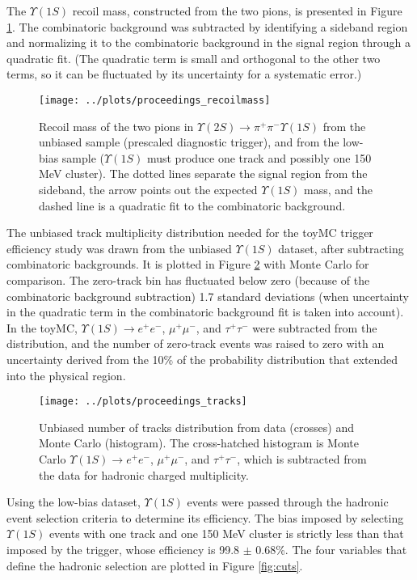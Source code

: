 \documentclass[aps,prd,preprint,superscriptaddress,tightenlines,nofootinbib,floatfix]{revtex4}
\begin{document}
The $\Upsilon(1S)$ recoil mass, constructed from the two pions, is
presented in Figure \ref{fig:recoilmass}.  The combinatoric background
was subtracted by identifying a sideband region and normalizing it to
the combinatoric background in the signal region through a quadratic
fit.  (The quadratic term is small and orthogonal to the other two
terms, so it can be fluctuated by its uncertainty for a systematic
error.)

\begin{figure}[p]
  \texttt{[image: ../plots/proceedings\_recoilmass]}
  \caption{\label{fig:recoilmass} Recoil mass of the two pions in
    $\Upsilon(2S) \to \pi^+\pi^- \Upsilon(1S)$ from the unbiased
    sample (prescaled diagnostic trigger), and from the low-bias
    sample ($\Upsilon(1S)$ must produce one track and possibly one 150
    MeV cluster).  The dotted lines separate the signal region from
    the sideband, the arrow points out the expected $\Upsilon(1S)$
    mass, and the dashed line is a quadratic fit to the combinatoric
    background.}
\end{figure}

The unbiased track multiplicity distribution needed for the toyMC
trigger efficiency study was drawn from the unbiased $\Upsilon(1S)$
dataset, after subtracting combinatoric backgrounds.  It is plotted in
Figure \ref{fig:unbiasedtracks} with Monte Carlo for comparison.  The
zero-track bin has fluctuated below zero (because of the combinatoric
background subtraction) 1.7 standard deviations (when uncertainty in
the quadratic term in the combinatoric background fit is taken into
account).  In the toyMC, $\Upsilon(1S) \to e^+e^-$, $\mu^+\mu^-$, and
$\tau^+\tau^-$ were subtracted from the distribution, and the number
of zero-track events was raised to zero with an uncertainty derived
from the 10\% of the probability distribution that extended into the
physical region.

\begin{figure}[p]
  \texttt{[image: ../plots/proceedings\_tracks]}
  \caption{\label{fig:unbiasedtracks} Unbiased number of tracks
    distribution from data (crosses) and Monte Carlo (histogram).  The
    cross-hatched histogram is Monte Carlo $\Upsilon(1S) \to e^+e^-$,
    $\mu^+\mu^-$, and $\tau^+\tau^-$, which is subtracted from the
    data for hadronic charged multiplicity.}
\end{figure}

Using the low-bias dataset, $\Upsilon(1S)$ events were passed through
the hadronic event selection criteria to determine its efficiency.
The bias imposed by selecting $\Upsilon(1S)$ events with one track and
one 150 MeV cluster is strictly less than that imposed by the trigger,
whose efficiency is 99.8 $\pm$ 0.68\%.  The four variables that define
the hadronic selection are plotted in Figure \ref{fig:cuts}.
\end{document}

